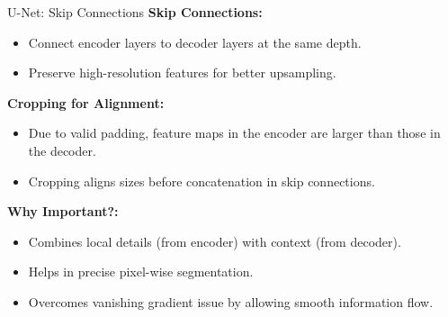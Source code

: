 \documentclass[serif, aspectratio=169]{beamer}
\begin{document}
\begin{frame}{U-Net: Skip Connections}
\small
    \textbf{Skip Connections:}
    \begin{itemize}
        \item Connect encoder layers to decoder layers at the same depth.
        \item Preserve high-resolution features for better upsampling.
    \end{itemize}
    
    \vspace{0.5cm} %
    
    \textbf{Cropping for Alignment:}
    \begin{itemize}
        \item Due to valid padding, feature maps in the encoder are larger than those in the decoder.
        \item Cropping aligns sizes before concatenation in skip connections.
    \end{itemize}
    
    \vspace{0.5cm} %
    
    \textbf{Why Important?:}
    \begin{itemize}
        \item Combines local details (from encoder) with context (from decoder).
        \item Helps in precise pixel-wise segmentation.
        \item Overcomes vanishing gradient issue by allowing smooth information flow.
    \end{itemize}
\end{frame}
\end{document}
